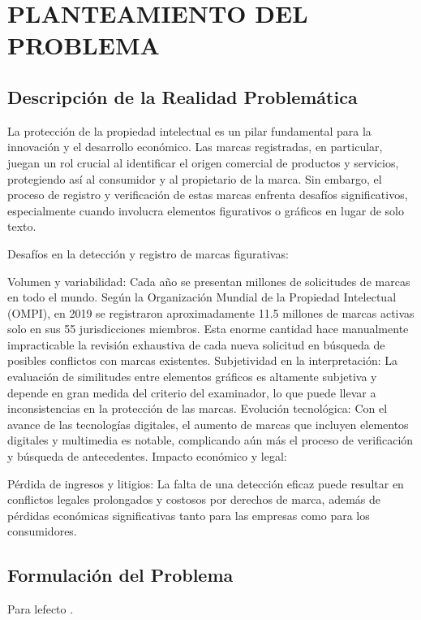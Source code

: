 \chapter{PLANTEAMIENTO DEL PROBLEMA}
\section{Descripción de la Realidad Problemática}

La protección de la propiedad intelectual es un pilar fundamental para la innovación y el desarrollo económico. Las marcas registradas, en particular, juegan un rol crucial al identificar el origen comercial de productos y servicios, protegiendo así al consumidor y al propietario de la marca. Sin embargo, el proceso de registro y verificación de estas marcas enfrenta desafíos significativos, especialmente cuando involucra elementos figurativos o gráficos en lugar de solo texto.

Desafíos en la detección y registro de marcas figurativas:

Volumen y variabilidad: Cada año se presentan millones de solicitudes de marcas en todo el mundo. Según la Organización Mundial de la Propiedad Intelectual (OMPI), en 2019 se registraron aproximadamente 11.5 millones de marcas activas solo en sus 55 jurisdicciones miembros. Esta enorme cantidad hace manualmente impracticable la revisión exhaustiva de cada nueva solicitud en búsqueda de posibles conflictos con marcas existentes.
Subjetividad en la interpretación: La evaluación de similitudes entre elementos gráficos es altamente subjetiva y depende en gran medida del criterio del examinador, lo que puede llevar a inconsistencias en la protección de las marcas.
Evolución tecnológica: Con el avance de las tecnologías digitales, el aumento de marcas que incluyen elementos digitales y multimedia es notable, complicando aún más el proceso de verificación y búsqueda de antecedentes.
Impacto económico y legal:

Pérdida de ingresos y litigios: La falta de una detección eficaz puede resultar en conflictos legales prolongados y costosos por derechos de marca, además de pérdidas económicas significativas tanto para las empresas como para los consumidores.
 

\section{Formulación del Problema}

Para lefecto \parencite{ot_marti2018manual}. 


